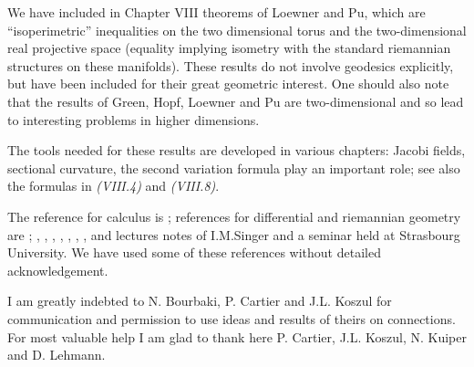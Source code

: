We have included in Chapter VIII theorems of Loewner and Pu, which are
``isoperimetric'' inequalities on the two dimensional torus and the
two-dimensional real projective space (equality implying isometry with
the standard riemannian structures on these manifolds). These results
do not involve geodesics explicitly, but have been included for their
great geometric interest. One should also note that the results of
Green, Hopf, Loewner and Pu are two-dimensional and so lead to
interesting problems in higher dimensions.

The tools needed for these results are developed in various chapters:
Jacobi fields, sectional curvature, the second variation formula play
an important role; see also the formulas in {\em (VIII.4)} and {\em
  (VIII.8)}.

The reference for calculus is \cite{36}; references for differential
and riemannian geometry are \cite{14}; \cite{16}, \cite{17},
\cite{18}, \cite{19}, \cite{21}, \cite{33}, \cite{35}, and lectures
notes of I.M.Singer and a seminar held at Strasbourg University. We
have used some of these references without detailed acknowledgement.

I am greatly indebted to N. Bourbaki, P. Cartier and J.L. Koszul for
communication and permission to use ideas and results of theirs on
connections. For most valuable help I am glad to thank here
P. Cartier, J.L. Koszul, N. Kuiper and D. Lehmann.

